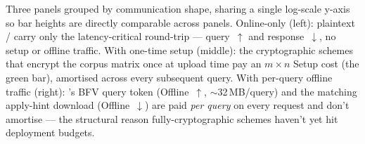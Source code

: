 Three panels grouped by communication shape, sharing a single
log-scale y-axis so bar heights are directly comparable across
panels. \textsf{Online-only} (left): plaintext / \sap carry only the
latency-critical round-trip --- query~$\uparrow$ and
response~$\downarrow$, no setup or offline traffic. \textsf{With
one-time setup} (middle): the cryptographic schemes that encrypt
the corpus matrix once at upload time pay an $m \times n$ Setup
cost (the green bar), amortised across every subsequent query.
\textsf{With per-query offline traffic} (right): \tiptoe's BFV
query token (Offline~$\uparrow$, $\sim$32\,MB/query) and the
matching apply-hint download (Offline~$\downarrow$) are paid
\emph{per query} on every request and don't amortise --- the
structural reason fully-cryptographic schemes haven't yet hit
deployment budgets.
